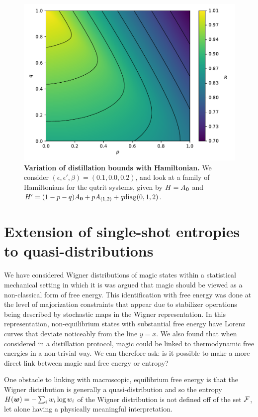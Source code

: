 \documentclass[pra,
aps,
twocolumn,
superscriptaddress,
groupedaddress,
nofootinbib,
reprint
]{revtex4-1}
\begin{document}
\begin{figure}
    \centering
    \includegraphics[scale=0.4]{figs/test/R_vs_A.pdf}
    \caption{\textbf{Variation of distillation bounds with Hamiltonian.} We consider $(\epsilon, \epsilon', \beta) = (0.1, 0.0, 0.2)$, and look at a family of Hamiltonians for the qutrit systems, given by $H = A_{\bm{0}}$ and $H' = (1-p-q)A_{\bm{0}}+pA_{(1,2)}+q{\rm{diag}}(0,1,2)$.
    }
    \label{fig:rvsa}
\end{figure}

\section{Extension of single-shot entropies to quasi-distributions}\label{section:entropies}
We have considered Wigner distributions of magic states within a statistical mechanical setting in which it is was argued that magic should be viewed as a non-classical form of free energy. This identification with free energy was done at the level of majorization constraints that appear due to stabilizer operations being described by stochastic maps in the Wigner representation. In this representation, non-equilibrium states with substantial free energy have Lorenz curves that deviate noticeably from the line $y=x$. We also found that when considered in a distillation protocol, magic could be linked to thermodynamic free energies in a non-trivial way. We can therefore ask: is it possible to make a more direct link between magic and free energy or entropy?

One obstacle to linking with macroscopic, equilibrium free energy is that the Wigner distribution is generally a quasi-distribution and so the entropy $H(\boldsymbol{w}) = -\sum_i w_i \log w_i$ of the Wigner distribution is not defined off of the set ${\mathcal F}$, let alone having a physically meaningful interpretation. 
\end{document}
